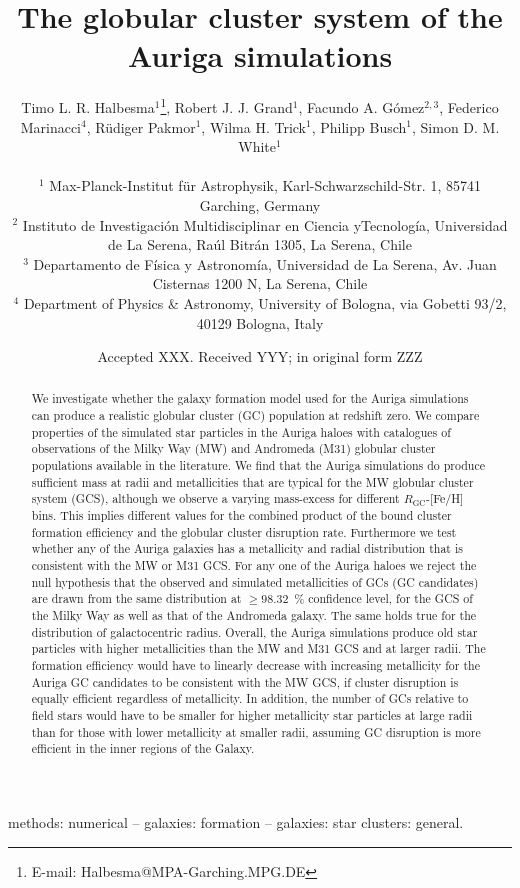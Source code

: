 \documentclass[a4paper,fleqn,usenatbib]{mnras}
\title[Auriga GCS]{The globular cluster system of the Auriga simulations}
\author[T. L. R. Halbesma et al.]{\parbox[t]{\textwidth}{
    Timo L. R. Halbesma$^{1}$\thanks{E-mail: Halbesma@MPA-Garching.MPG.DE},
    Robert J. J. Grand$^{1}$,
    Facundo A. G\'{o}mez$^{2,3}$,
    Federico Marinacci$^{4}$,
    R\"{u}diger Pakmor$^{1}$,
    Wilma H. Trick$^{1}$,
    Philipp Busch$^{1}$,
    Simon D. M. White$^{1}$
} \vspace{10pt} \\
$^{1}$ Max-Planck-Institut f\"ur Astrophysik, Karl-Schwarzschild-Str. 1,
    85741 Garching, Germany \\
$^{2}$ Instituto de Investigaci\'{o}n Multidisciplinar en Ciencia yTecnolog\'{i}a,
    Universidad de La Serena, Ra\'{u}l Bitr\'{a}n 1305, La Serena, Chile \\
$^{3}$ Departamento de F\'{i}sica y Astronom\'{i}a, Universidad de La Serena, Av.
    Juan Cisternas 1200 N, La Serena, Chile \\
$^{4}$ Department of Physics \& Astronomy, University of Bologna, via Gobetti 93/2, 40129 Bologna, Italy \\
}
\date{Accepted XXX. Received YYY; in original form ZZZ}
\begin{document}
\label{firstpage}
\pagerange{\pageref{firstpage}--\pageref{lastpage}}
\maketitle

\begin{abstract}
We investigate whether the galaxy formation model used for the Auriga simulations
can produce a realistic globular cluster (GC) population at redshift zero. We
compare properties of the simulated star particles in the Auriga haloes with
catalogues of observations of the Milky Way (MW) and Andromeda (M31) globular
cluster populations available in the literature. We find that the Auriga 
simulations do produce sufficient mass at radii and metallicities that are 
typical for the MW globular cluster system (GCS), although we observe a varying 
mass-excess for different $R_{\text{GC}}$-[Fe/H] bins. This implies different 
values for the combined product of the bound cluster formation efficiency and 
the globular cluster disruption rate. Furthermore we test whether any of the 
Auriga galaxies has a metallicity and radial distribution that is consistent with 
the MW or M31 GCS. For any one of the Auriga haloes we reject the null hypothesis
that the observed and simulated metallicities of GCs (GC candidates) are drawn
from the same distribution at $\geq98.32$~\% confidence level, for the GCS of 
the Milky Way as well as that of the Andromeda galaxy. The same holds true for 
the distribution of galactocentric radius. Overall, the Auriga simulations produce 
old star particles with higher metallicities than the MW and M31 GCS and at 
larger radii. The formation efficiency would have to linearly decrease with 
increasing metallicity for the Auriga GC candidates to be consistent with the 
MW GCS, if cluster disruption is equally efficient regardless of metallicity.
In addition, the number of GCs relative to field stars would have to be smaller
for higher metallicity star particles at large radii than for those with lower 
metallicity at smaller radii, assuming GC disruption is more efficient in the
inner regions of the Galaxy.

\end{abstract}

\begin{keywords}
methods: numerical -- galaxies: formation -- galaxies: star clusters: general.
\end{keywords}
\end{document}
